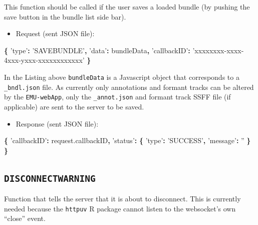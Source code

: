 \documentclass[]{book}
\newenvironment{Shaded}{\begin{snugshade}}{\end{snugshade}}
\newcommand{\AttributeTok}[1]{\textcolor[rgb]{0.77,0.63,0.00}{#1}}
\newcommand{\NormalTok}[1]{#1}
\newcommand{\OperatorTok}[1]{\textcolor[rgb]{0.81,0.36,0.00}{\textbf{#1}}}
\newcommand{\StringTok}[1]{\textcolor[rgb]{0.31,0.60,0.02}{#1}}
\newcommand{\VariableTok}[1]{\textcolor[rgb]{0.00,0.00,0.00}{#1}}
\providecommand{\tightlist}{%
  \setlength{\itemsep}{0pt}\setlength{\parskip}{0pt}}
\theoremstyle{definition}
\theoremstyle{definition}
\theoremstyle{definition}
\theoremstyle{remark}
\begin{document}
This function should be called if the user saves a loaded bundle (by
pushing the save button in the bundle list side bar).

\begin{itemize}
\tightlist
\item
  Request (sent JSON file):
\end{itemize}

\begin{Shaded}
\begin{Highlighting}[]
\OperatorTok{\{}
  \StringTok{'type'}\OperatorTok{:} \StringTok{'SAVEBUNDLE'}\OperatorTok{,}
  \StringTok{'data'}\OperatorTok{:}\NormalTok{ bundleData}\OperatorTok{,}
  \StringTok{'callbackID'}\OperatorTok{:} \StringTok{'xxxxxxxx-xxxx-4xxx-yxxx-xxxxxxxxxxxx'}
\OperatorTok{\}}
\end{Highlighting}
\end{Shaded}

In the Listing above \texttt{bundleData} is a Javascript object that
corresponds to a \texttt{\_bndl.json} file. As currently only
annotations and formant tracks can be altered by the
\texttt{EMU-webApp}, only the \texttt{\_annot.json} and formant track
SSFF file (if applicable) are sent to the server to be saved.

\begin{itemize}
\tightlist
\item
  Response (sent JSON file):
\end{itemize}

\begin{Shaded}
\begin{Highlighting}[]
\OperatorTok{\{}
  \StringTok{'callbackID'}\OperatorTok{:} \VariableTok{request}\NormalTok{.}\AttributeTok{callbackID}\OperatorTok{,}
  \StringTok{'status'}\OperatorTok{:} \OperatorTok{\{}
    \StringTok{'type'}\OperatorTok{:} \StringTok{'SUCCESS'}\OperatorTok{,}
    \StringTok{'message'}\OperatorTok{:} \StringTok{''}
  \OperatorTok{\}}
\OperatorTok{\}}
\end{Highlighting}
\end{Shaded}

\hypertarget{disconnectwarning}{%
\subsection{\texorpdfstring{\texttt{DISCONNECTWARNING}}{DISCONNECTWARNING}}\label{disconnectwarning}}

Function that tells the server that it is about to disconnect. This is
currently needed because the \texttt{httpuv} R package cannot listen to
the websocket's own ``close'' event.
\end{document}

